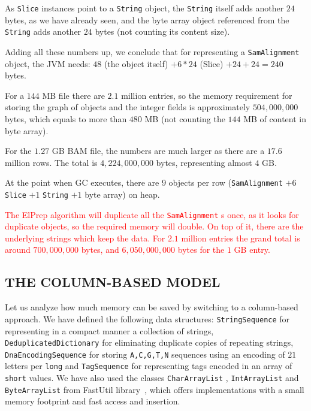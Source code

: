 \documentclass[a4paper,twoside]{article}
\begin{document}

As {\texttt{Slice} } instances point to a {\texttt{String} } object, the {\texttt{String} } itself adds another $24$ bytes, as we have already seen, and the byte array object referenced from the {\texttt{String} } adds another $24$ bytes (not counting its content size).


Adding all these numbers up, we conclude that for representing a {\texttt{SamAlignment} } object, the JVM needs: $48$ (the object itself) $+ 6*24$ (Slice) $ + 24 + 24 = 240$ bytes.

For a $144$ MB file there are $2.1$ million entries, so the memory requirement for storing the graph of objects and the integer fields is approximately $504,000,000$ bytes, which equals to more than $480$ MB (not counting the $144$ MB of content in byte array).

For the $1.27$ GB BAM file, the numbers are much larger as there are a $17.6$ million rows.
The total is $4,224,000,000$ bytes, representing almost $4$ GB\@.


At the point when GC executes, there are $9$ objects per row 
({\texttt{SamAlignment} } $+ 6$ {\texttt{Slice} } $+ 1$ {\texttt{String} } $+ 1$ byte array) on heap.

\textcolor{red}{
The ElPrep algorithm will duplicate all the {\texttt{SamAlignment} }s once, as it looks for duplicate objects, so the required memory will double.
On top of it, there are the underlying strings which keep the data.
For $2.1$ million entries the grand total is around $700,000,000$ bytes, and $6,050,000,000$ bytes for the $1$ GB entry.
}



\subsection{\uppercase{The Column-Based Model}} \label{model:column}

Let us analyze how much memory can be saved by switching to a column-based approach.
We have defined the following data structures: {\texttt{StringSequence} } for representing in a compact manner a collection of strings, {\texttt{DeduplicatedDictionary} } for eliminating duplicate copies of repeating strings, {\texttt{DnaEncodingSequence} } for storing {\texttt{A,C,G,T,N} } sequences using an encoding of $21$ letters per {\texttt{long} } and {\texttt{TagSequence} } for representing tags encoded in an array of {\texttt{short} } values.
We have also used the classes {\texttt{CharArrayList} }, {\texttt{IntArrayList} } and {\texttt{ByteArrayList} } from FastUtil library~\cite{fastutil}, which offers implementations with a small memory footprint and fast access and insertion.
\end{document}
